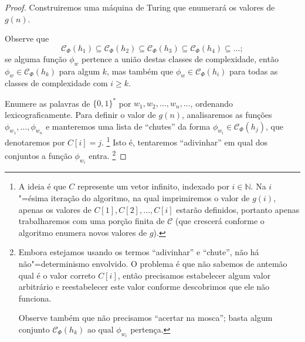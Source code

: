 \begin{proof}
    Construiremos uma máquina de Turing
    que enumerará os valores de $g(n)$.

    Observe que
    \begin{equation*}
        \mathcal C_\Phi(h_1) \subseteq
        \mathcal C_\Phi(h_2) \subseteq
        \mathcal C_\Phi(h_3) \subseteq
        \mathcal C_\Phi(h_4) \subseteq
        \dots;
    \end{equation*}
    se alguma função $\phi_w$ pertence a união destas classes de complexidade,
    então $\phi_w \in \mathcal C_\Phi(h_k)$ para algum $k$,
    mas também que $\phi_w \in \mathcal C_\Phi(h_i)$
    para todas as classes de complexidade com $i \geq k$.

    Enumere as palavras de $\{0, 1\}^*$ por $w_1, w_2, \dots, w_n, \dots$,
    ordenando lexicograficamente.
    Para definir o valor de $g(n)$,
    analisaremos as funções $\phi_{w_1}, \dots, \phi_{w_n}$
    e manteremos uma lista de ``chutes''
    da forma $\phi_{w_i} \in \mathcal C_\Phi(h_j)$,
    que denotaremos por $C[i] = j$.%
    \footnote{
        A ideia é que $C$ represente um vetor infinito,
        indexado por $i \in \mathbb N$.
        Na $i$"=ésima iteração do algoritmo,
        na qual imprimiremos o valor de $g(i)$,
        apenas os valores de $C[1], C[2], \dots, C[i]$
        estarão definidos,
        portanto apenas trabalharemos com uma porção finita de $\mathcal C$
        (que crescerá conforme o algoritmo enumera novos valores de $g$).
    }
    Isto é, tentaremos ``adivinhar''
    em qual dos conjuntos a função $\phi_{w_i}$ entra.%
    \footnote{
        Embora estejamos usando os termos
        ``adivinhar'' e ``chute'',
        não há não"=determinismo envolvido.
        O problema é que não sabemos de antemão
        qual é o valor correto $C[i]$,
        então precisamos estabelecer algum valor arbitrário
        e reestabelecer este valor
        conforme descobrimos que ele não funciona.

        Observe também que não precisamos
        ``acertar na mosca'';
        basta algum conjunto $\mathcal C_\Phi(h_k)$
        ao qual $\phi_{w_i}$ pertença.
    }


\end{proof}
